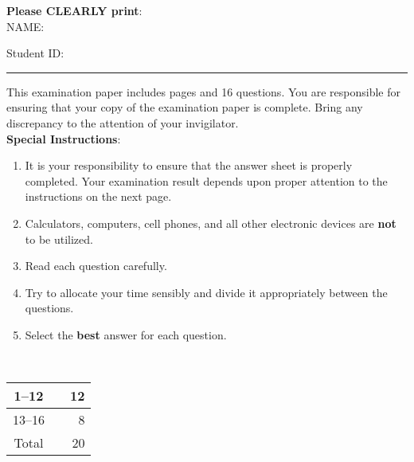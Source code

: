 \documentclass[12pt,fleqn]{examtst}
\begin{document}
\begin{minipage}[t]{1.0\textwidth}
\textbf{Please CLEARLY print}:\\[2mm]

NAME:\\[1ex]

\newsavebox{\bb}\newsavebox{\bbb}
\sbox{\bb}{\framebox[1cm]{\rule{0mm}{7mm}}}
\sbox{\bbb}{\usebox{\bb}\usebox{\bb}\usebox{\bb}\usebox{\bb}\usebox{\bb}\usebox{\bb}\usebox{\bb}\usebox{\bb}\usebox{\bb}}

Student ID: \usebox{\bbb} \\[2mm]

\rule[3 mm]{\textwidth}{0.5mm}

This examination paper includes \noofpages pages and
16 %
questions. You are responsible for ensuring that your copy of the examination
paper is complete. Bring any discrepancy to the attention
of your invigilator.\\

\textbf{Special Instructions}:

\begin{enumerate}

\item It is your responsibility to ensure that the answer sheet is properly
  completed. Your examination result depends upon proper attention to the
  instructions on the next page.
\item Calculators, computers, cell phones, and all other electronic devices are
  \textbf{not} to be utilized.
\item Read each question carefully.
\item Try to allocate your time sensibly and divide it appropriately between the
  questions.
\item Select the \textbf{best} answer for each question.
\end{enumerate}
\end{minipage}\\

\hspace{14cm}
\begin{minipage}[t]{0.2\textwidth}
\newcommand{\markheight}{\rule[-2mm]{0 mm}{7 mm}}
\begin{tabular}[t]{|c|p{1.5 cm}|r|}
\hline
1--12 & \markheight & 12\\
\hline
13--16 & \markheight & 8\\

\hline
Total & \markheight & 20 \\
\hline

\end{tabular}
\end{minipage}
\end{document}
